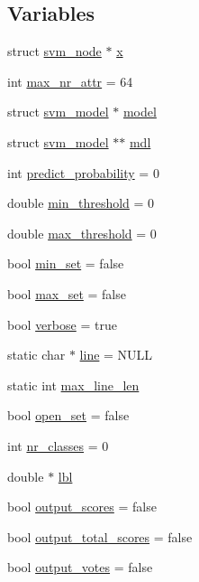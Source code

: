 \subsection*{Variables}
\begin{DoxyCompactItemize}
\item 
struct \hyperlink{structsvm__node}{svm\-\_\-node} $\ast$ \hyperlink{_2svm-predict_8cpp_a9a5b72a4065074cac5da07efb80a1e79}{x}
\item 
int \hyperlink{_2svm-predict_8cpp_af95bde9162db2c5dd97e80795b3548ed}{max\-\_\-nr\-\_\-attr} = 64
\item 
struct \hyperlink{structsvm__model}{svm\-\_\-model} $\ast$ \hyperlink{_2svm-predict_8cpp_a50c87b127b14787341e9630f4f5c700a}{model}
\item 
struct \hyperlink{structsvm__model}{svm\-\_\-model} $\ast$$\ast$ \hyperlink{_2svm-predict_8cpp_a639aa8f86cbf6b9c5d43e0c5082e26ac}{mdl}
\item 
int \hyperlink{_2svm-predict_8cpp_a1501132f5226b295e5300d74da55a2b9}{predict\-\_\-probability} = 0
\item 
double \hyperlink{_2svm-predict_8cpp_a3670388207cf8d0f4f4c9237a1482057}{min\-\_\-threshold} = 0
\item 
double \hyperlink{_2svm-predict_8cpp_a9090dc0b930a5f9212a3b6f3e4b5c5ab}{max\-\_\-threshold} = 0
\item 
bool \hyperlink{_2svm-predict_8cpp_aa816fb83dd1b415e1339bb8ddd6cdabc}{min\-\_\-set} = false
\item 
bool \hyperlink{_2svm-predict_8cpp_acd0f485f4131af58e0bdb273316d3805}{max\-\_\-set} = false
\item 
bool \hyperlink{_2svm-predict_8cpp_ab3f078684998b83967d507d0f453f454}{verbose} = true
\item 
static char $\ast$ \hyperlink{_2svm-predict_8cpp_a8adb30f4f6669f927fd9232f686c637b}{line} = N\-U\-L\-L
\item 
static int \hyperlink{_2svm-predict_8cpp_acad24c15bee67d2026f56bc94a1188c7}{max\-\_\-line\-\_\-len}
\item 
bool \hyperlink{_2svm-predict_8cpp_a17843ee1d8102ef588a3f997e827bc70}{open\-\_\-set} = false
\item 
int \hyperlink{_2svm-predict_8cpp_ad88594354ad0cd1b5f3cebf37f8381cf}{nr\-\_\-classes} = 0
\item 
double $\ast$ \hyperlink{_2svm-predict_8cpp_a537df30cd5b5b576ee32aeffd22affe2}{lbl}
\item 
bool \hyperlink{_2svm-predict_8cpp_a7ce2b5cbc37a137a91ecc0cf035faba7}{output\-\_\-scores} = false
\item 
bool \hyperlink{_2svm-predict_8cpp_aa63d504586762ed1e2b057a76018d0fd}{output\-\_\-total\-\_\-scores} = false
\item 
bool \hyperlink{_2svm-predict_8cpp_ac3602f56435c68a322553ed33804e5d1}{output\-\_\-votes} = false
\end{DoxyCompactItemize}


